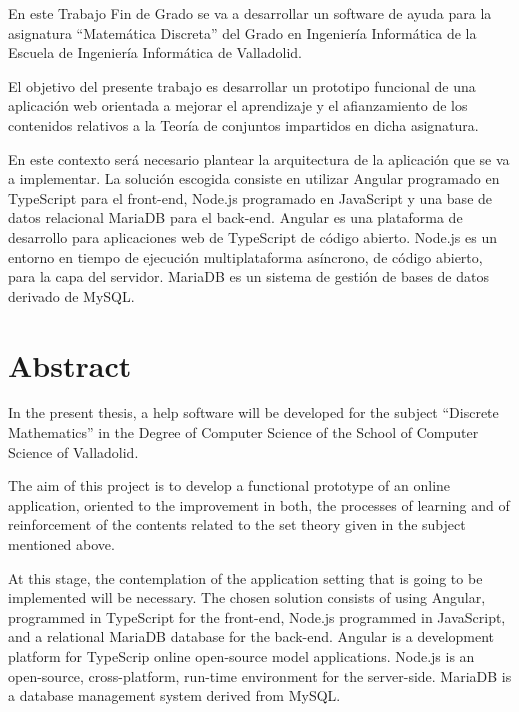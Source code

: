 \documentclass[openright,twoside,10pt]{book}
\begin{document}
    En este Trabajo Fin de Grado se va a desarrollar un software de ayuda
    para la asignatura ``Matemática Discreta'' del Grado en Ingeniería
    Informática de la Escuela de Ingeniería Informática de Valladolid.
    
    El objetivo del presente trabajo es desarrollar un prototipo funcional
    de una aplicación web orientada a mejorar el aprendizaje y el
    afianzamiento de los contenidos relativos a la Teoría de conjuntos
    impartidos en dicha asignatura.
    
    En este contexto será necesario plantear la arquitectura de la
    aplicación que se va a implementar. La solución escogida consiste en
    utilizar Angular programado en TypeScript para el front-end, Node.js
    programado en JavaScript y una base de datos relacional MariaDB para el
    back-end. Angular es una plataforma de desarrollo para aplicaciones web
    de TypeScript de código abierto. Node.js es un entorno en tiempo de
    ejecución multiplataforma asíncrono, de código abierto, para la capa del
    servidor. MariaDB es un sistema de gestión de bases de datos derivado de
    MySQL.



    \chapter*{Abstract} %
  
    In the present thesis, a help software will be developed for the subject
    ``Discrete Mathematics'' in the Degree of Computer Science of the School
    of Computer Science of Valladolid.
    
    The aim of this project is to develop a functional prototype of an
    online application, oriented to the improvement in both, the processes
    of learning and of reinforcement of the contents related to the set
    theory given in the subject mentioned above.
    
    At this stage, the contemplation of the application setting that is
    going to be implemented will be necessary. The chosen solution consists
    of using Angular, programmed in TypeScript for the front-end, Node.js
    programmed in JavaScript, and a relational MariaDB database for the
    back-end. Angular is a development platform for TypeScrip online
    open-source model applications. Node.js is an open-source,
    cross-platform, run-time environment for the server-side. MariaDB is a
    database management system derived from MySQL.
\end{document}
